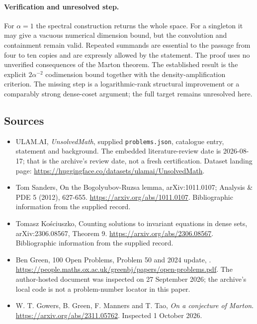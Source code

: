 \documentclass[11pt,a4paper]{article}
\begin{document}
\paragraph{Verification and unresolved step.}
For $\alpha=1$ the spectral construction returns the whole space. For a singleton it may give a vacuous numerical dimension bound, but the convolution and containment remain valid. Repeated summands are essential to the passage from four to ten copies and are expressly allowed by the statement. The proof uses no unverified consequences of the Marton theorem. The established result is the explicit $2\alpha^{-2}$ codimension bound together with the density-amplification criterion. The missing step is a logarithmic-rank structural improvement or a comparably strong dense-coset argument; the full target remains unresolved here.

\subsection{Sources}

{\small

\begin{itemize}

\item[\hypertarget{source:statement:1}{S1}] ULAM.AI, \emph{UnsolvedMath}, supplied \texttt{problems.json}, catalogue entry, statement and background. The embedded literature-review date is 2026-08-17; that is the archive’s review date, not a fresh certification. Dataset landing page: \url{https://huggingface.co/datasets/ulamai/UnsolvedMath}.

\item[\hypertarget{source:statement:2}{S2}] Tom Sanders, On the Bogolyubov-Ruzsa lemma, arXiv:1011.0107; Analysis \& PDE 5 (2012), 627-655. \url{https://arxiv.org/abs/1011.0107}. Bibliographic information from the supplied record.

\item[\hypertarget{source:statement:3}{S3}] Tomasz Kościuszko, Counting solutions to invariant equations in dense sets, arXiv:2306.08567, Theorem 9. \url{https://arxiv.org/abs/2306.08567}. Bibliographic information from the supplied record.

\item[\hypertarget{source:statement:4}{S4}] Ben Green, 100 Open Problems, Problem 50 and 2024 update, . \url{https://people.maths.ox.ac.uk/greenbj/papers/open-problems.pdf}. The author-hosted document was inspected on 27 September 2026; the archive’s local code is not a problem-number locator in this paper.

\item[E1] W. T. Gowers, B. Green, F. Manners and T. Tao, \emph{On a conjecture of Marton}. \url{https://arxiv.org/abs/2311.05762}. Inspected 1 October 2026.

\end{itemize}

}

\label{end:statement}
\end{document}
